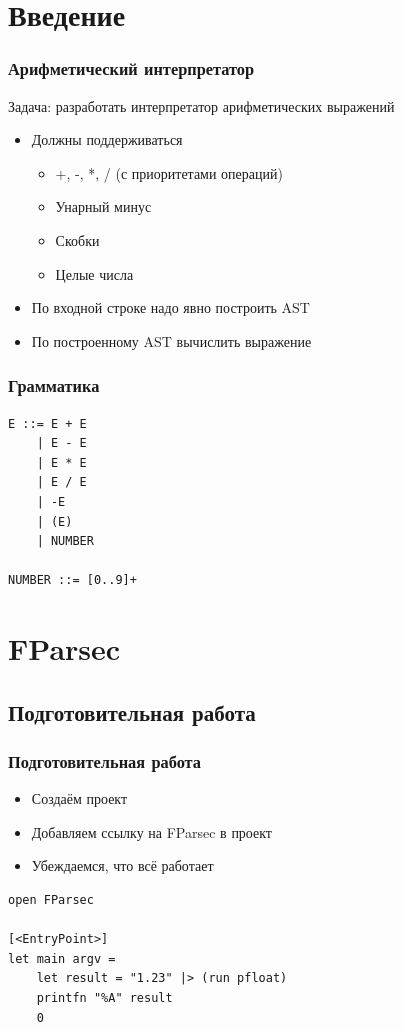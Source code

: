 \documentclass{../../slides-style}
\begin{document}
    \begin{frame}[plain]
        \titlepage
    \end{frame}

    \section{Введение}
    
    \begin{frame}
        \frametitle{Арифметический интерпретатор}
        Задача: разработать интерпретатор арифметических выражений
        \begin{itemize}
            \item Должны поддерживаться 
            \begin{itemize}
                \item +, -, *, / (с приоритетами операций)
                \item Унарный минус
                \item Скобки
                \item Целые числа
            \end{itemize}
            \item По входной строке надо явно построить AST
            \item По построенному AST вычислить выражение
        \end{itemize}
    \end{frame}

    \begin{frame}[fragile]
        \frametitle{Грамматика}
        \begin{verbatim}
E ::= E + E
    | E - E
    | E * E
    | E / E
    | -E
    | (E)
    | NUMBER

NUMBER ::= [0..9]+
        \end{verbatim}
    \end{frame}

    \section{FParsec}

    \subsection{Подготовительная работа}

    \begin{frame}[fragile]
        \frametitle{Подготовительная работа}
        \begin{itemize}
            \item Создаём проект
            \item Добавляем ссылку на FParsec в проект
            \item Убеждаемся, что всё работает
        \end{itemize}
        \begin{verbatim}
open FParsec

[<EntryPoint>]
let main argv =
    let result = "1.23" |> (run pfloat)
    printfn "%A" result
    0 
        \end{verbatim}
    \end{frame}
\end{document}
